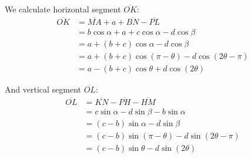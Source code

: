 \documentclass[11pt]{article}
\begin{document}
We calculate horizontal segment $\overline{OK}$:
\begin{align}
\overline{OK} &= \overline{MA} + a + \overline{BN} - \overline{PL} \nonumber\\
 &= b\cos{\alpha} + a + c\cos{\alpha} - d\cos{\beta} \nonumber\\
 &= a + (b+c)\cos{\alpha} - d\cos{\beta} \nonumber\\
 &= a + (b+c)\cos{(\pi-\theta)} - d\cos{(2\theta - \pi)} \nonumber\\
 &= a - (b+c)\cos{\theta} + d\cos{(2\theta)}
\end{align} 

And vertical segment $\overline{OL}$:
\begin{align}
\overline{OL} &= \overline{KN} - \overline{PH} - \overline{HM} \nonumber\\
 &= c\sin{\alpha} - d\sin{\beta} - b\sin{\alpha} \nonumber\\
 &= (c-b)\sin{\alpha} - d\sin{\beta} \nonumber\\
 &= (c-b)\sin{(\pi-\theta)} - d\sin{(2\theta-\pi)} \nonumber\\
 &= (c-b)\sin{\theta} - d\sin{(2\theta)}
\end{align}
\end{document}

